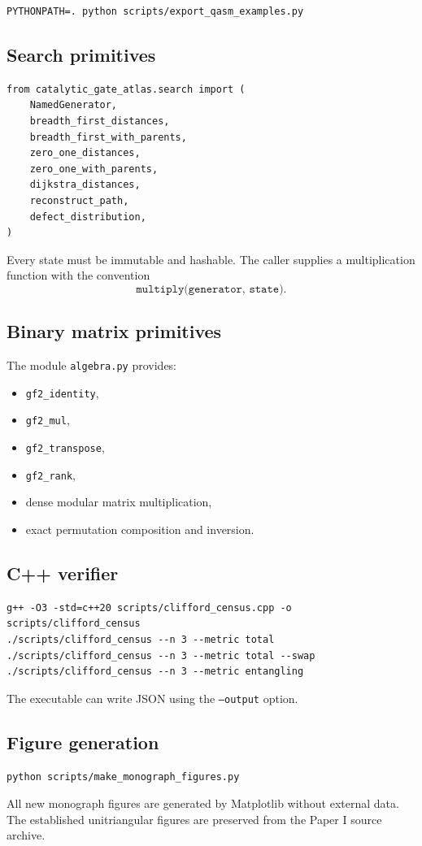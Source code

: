 \begin{verbatim}
PYTHONPATH=. python scripts/export_qasm_examples.py
\end{verbatim}

\subsection{Search primitives}
\begin{lstlisting}[style=pythonstyle]
from catalytic_gate_atlas.search import (
    NamedGenerator,
    breadth_first_distances,
    breadth_first_with_parents,
    zero_one_distances,
    zero_one_with_parents,
    dijkstra_distances,
    reconstruct_path,
    defect_distribution,
)
\end{lstlisting}
Every state must be immutable and hashable.  The caller supplies a multiplication function with the convention
\[
\texttt{multiply(generator, state)}.
\]

\subsection{Binary matrix primitives}
The module \texttt{algebra.py} provides:
\begin{itemize}
\item \texttt{gf2\_identity},
\item \texttt{gf2\_mul},
\item \texttt{gf2\_transpose},
\item \texttt{gf2\_rank},
\item dense modular matrix multiplication,
\item exact permutation composition and inversion.
\end{itemize}

\subsection{C++ verifier}
\begin{verbatim}
g++ -O3 -std=c++20 scripts/clifford_census.cpp -o scripts/clifford_census
./scripts/clifford_census --n 3 --metric total
./scripts/clifford_census --n 3 --metric total --swap
./scripts/clifford_census --n 3 --metric entangling
\end{verbatim}
The executable can write JSON using the \texttt{--output} option.

\subsection{Figure generation}
\begin{verbatim}
python scripts/make_monograph_figures.py
\end{verbatim}
All new monograph figures are generated by Matplotlib without external data.  The established unitriangular figures are preserved from the Paper I source archive.

